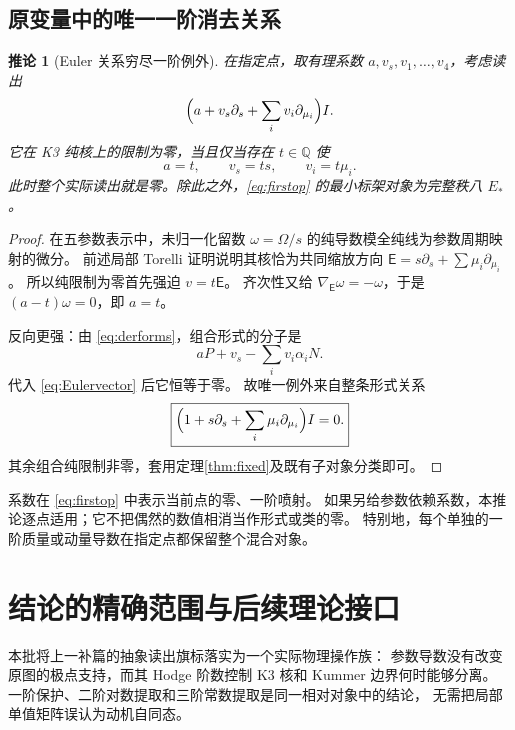 \documentclass[11pt,a4paper]{ctexart}
\theoremstyle{cnplain}
\newtheorem{corollary}[theorem]{推论}
\theoremstyle{definition}
\theoremstyle{remark}
\newcommand{\Q}{\mathbb Q}
\begin{document}
\subsection{原变量中的唯一一阶消去关系}
\begin{corollary}[Euler 关系穷尽一阶例外]\label{cor:Euler}
在指定点，取有理系数 $a,v_s,v_1,\ldots,v_4$，考虑读出
\begin{equation}\label{eq:firstop}
 \Bigl(a+v_s\partial_s+\sum_iv_i\partial_{\mu_i}\Bigr)I.
\end{equation}
它在 K3 纯核上的限制为零，当且仅当存在 $t\in\Q$ 使
\begin{equation}\label{eq:Eulervector}
 a=t,\qquad v_s=ts,\qquad v_i=t\mu_i.
\end{equation}
此时整个实际读出就是零。除此之外，\eqref{eq:firstop} 的最小标架对象为完整秩八 $E_*$。
\end{corollary}
\begin{proof}
在五参数表示中，未归一化留数 $\omega=\Omega/s$ 的纯导数模全纯线为参数周期映射的微分。
前述局部 Torelli 证明说明其核恰为共同缩放方向
$\mathsf E=s\partial_s+\sum\mu_i\partial_{\mu_i}$。
所以纯限制为零首先强迫 $v=t\mathsf E$。
齐次性又给 $\nabla_{\mathsf E}\omega=-\omega$，于是 $(a-t)\omega=0$，即 $a=t$。

反向更强：由 \eqref{eq:derforms}，组合形式的分子是
\[
 aP+v_s-\sum_i v_i\alpha_iN.
\]
代入 \eqref{eq:Eulervector} 后它恒等于零。
故唯一例外来自整条形式关系
\begin{equation}\label{eq:Euler}
 \boxed{\Bigl(1+s\partial_s+\sum_i\mu_i\partial_{\mu_i}\Bigr)I=0.}
\end{equation}
其余组合纯限制非零，套用定理\ref{thm:fixed}及既有子对象分类即可。
\end{proof}

系数在 \eqref{eq:firstop} 中表示当前点的零、一阶喷射。
如果另给参数依赖系数，本推论逐点适用；它不把偶然的数值相消当作形式或类的零。
特别地，每个单独的一阶质量或动量导数在指定点都保留整个混合对象。

\section{结论的精确范围与后续理论接口}
本批将上一补篇的抽象读出旗标落实为一个实际物理操作族：
参数导数没有改变原图的极点支持，而其 Hodge 阶数控制 K3 核和 Kummer 边界何时能够分离。
一阶保护、二阶对数提取和三阶常数提取是同一相对对象中的结论，
无需把局部单值矩阵误认为动机自同态。
\end{document}
